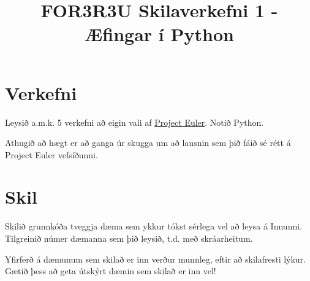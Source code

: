 \documentclass{article}
\title{FOR3R3U Skilaverkefni 1 - Æfingar í Python}
\begin{document}
\maketitle
\section{Verkefni}
Leysið a.m.k. 5 verkefni að eigin vali af \href{http://projecteuler.net/}{Project Euler}. Notið Python.

Athugið að hægt er að ganga úr skugga um að lausnin sem þið fáið sé rétt á Project Euler vefsíðunni.

\section{Skil}
Skilið grunnkóða tveggja dæma sem ykkur tókst sérlega vel að leysa á Innunni. Tilgreinið númer dæmanna sem þið leysið, t.d. með skráarheitum.

Yfirferð á dæmunum sem skilað er inn verður munnleg, eftir að skilafresti lýkur. Gætið þess að geta útskýrt dæmin sem skilað er inn vel!
\end{document}
